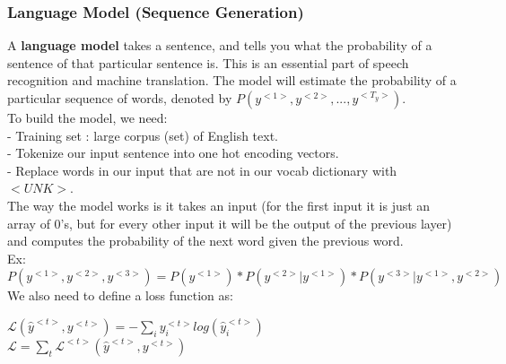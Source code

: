 \documentclass[11pt, a4paper]{article}
\begin{document}
\begin{spacing}{1.1}
	\subsubsection{Language Model (Sequence Generation)}
	A \textbf{language model} takes a sentence, and tells you what the probability of a sentence of that particular sentence is. This is an essential part of speech recognition and machine translation. The model will estimate the probability of a particular sequence of words, denoted by $P(y^{<1>}, y^{<2>}, ..., y^{<T_y>})$. \vspace*{2mm}\\
	To build the model, we need: \\
	- Training set : large corpus (set) of English text. \\
	- Tokenize our input sentence into one hot encoding vectors. \\
	- Replace words in our input that are not in our vocab dictionary with $<UNK>$. \vspace*{2mm}\\
	The way the model works is it takes an input (for the first input it is just an array of 0's, but for every other input it will be the output of the previous layer) and computes the probability of the next word given the previous word. \vspace*{1mm}\\
	Ex: $P(y^{<1>}, y^{<2>}, y^{<3>}) = P(y^{<1>}) * P(y^{<2>}|y^{<1>}) * P(y^{<3>}|y^{<1>},y^{<2>})$ \vspace*{1.5mm}\\
	We also need to define a loss function as:
	\begin{center}
	$\mathcal{L} (\hat{y}^{<t>}, y^{<t>}) = -\sum_i y_i^{<t>}log(\hat{y}_i^{<t>})$ \\
	$\mathcal{L} = \sum_t \mathcal{L}^{<t>}(\hat{y}^{<t>}, y^{<t>})$
	\end{center} \newpage


\end{spacing}
\end{document}
